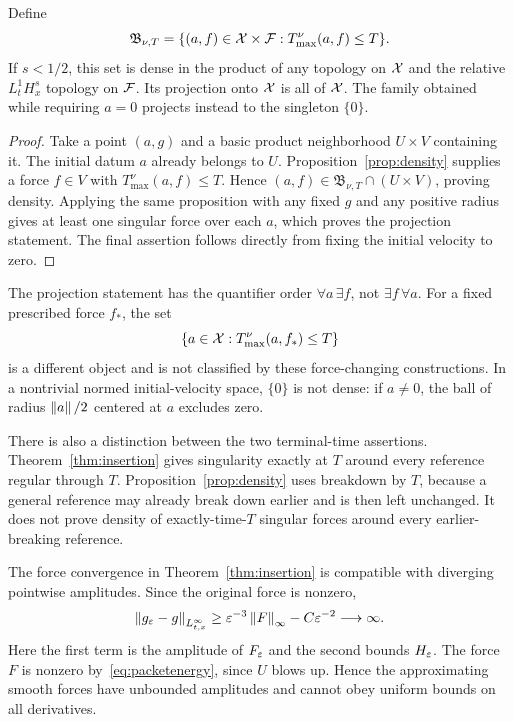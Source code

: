 \begin{proposition}\label{prop:projection}
Define
\[
 \mathfrak B_{\nu,T}
 =\{(a,f)\in\mathcal X\times\mathcal F:T_{\max}^{\nu}(a,f)\le T\}.
\]
If $s<1/2$, this set is dense in the product of any topology on $\mathcal X$ and the relative $L^1_tH^s_x$ topology on $\mathcal F$. Its projection onto $\mathcal X$ is all of $\mathcal X$.
The family obtained while requiring $a=0$ projects instead to the singleton $\{0\}$.
\end{proposition}
\begin{proof}
Take a point $(a,g)$ and a basic product neighborhood $U\times V$ containing it. The initial datum $a$ already belongs to $U$. Proposition~\ref{prop:density} supplies a force $f\in V$ with $T_{\max}^{\nu}(a,f)\le T$. Hence
$(a,f)\in\mathfrak B_{\nu,T}\cap(U\times V)$, proving density.
Applying the same proposition with any fixed $g$ and any positive radius gives at least one singular force over each $a$, which proves the projection statement. The final assertion follows directly from fixing the initial velocity to zero.
\end{proof}

The projection statement has the quantifier order
$\forall a\,\exists f$, not $\exists f\,\forall a$.
For a fixed prescribed force $f_*$, the set
\[
 \{a\in\mathcal X:T_{\max}^{\nu}(a,f_*)\le T\}
\]
is a different object and is not classified by these force-changing constructions.
In a nontrivial normed initial-velocity space, $\{0\}$ is not dense: if
$a\ne0$, the ball of radius $\left\lVert a\right\rVert/2$ centered at $a$ excludes zero.

There is also a distinction between the two terminal-time assertions.
Theorem~\ref{thm:insertion} gives singularity exactly at $T$ around every reference regular through $T$. Proposition~\ref{prop:density} uses breakdown by $T$, because a general reference may already break down earlier and is then left unchanged. It does not prove density of exactly-time-$T$ singular forces around every earlier-breaking reference.
\begin{remark}\label{rem:peaks}
The force convergence in Theorem~\ref{thm:insertion} is compatible with diverging pointwise amplitudes. Since the original force is nonzero,
\[
 \left\lVert g_\varepsilon-g\right\rVert_{L^\infty_{t,x}}
 \ge\varepsilon^{-3}\left\lVert F\right\rVert_\infty-C\varepsilon^{-2}\longrightarrow\infty.
\]
Here the first term is the amplitude of $F_\varepsilon$ and the second bounds $H_\varepsilon$. The force $F$ is nonzero by~\eqref{eq:packetenergy}, since $U$ blows up. Hence the approximating smooth forces have unbounded amplitudes and cannot obey uniform bounds on all derivatives.
\end{remark}

